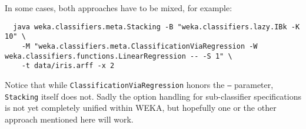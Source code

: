 \noindent In some cases, both approaches have to be mixed, for example:

{\scriptsize
\begin{verbatim}
  java weka.classifiers.meta.Stacking -B "weka.classifiers.lazy.IBk -K 10" \
    -M "weka.classifiers.meta.ClassificationViaRegression -W weka.classifiers.functions.LinearRegression -- -S 1" \
    -t data/iris.arff -x 2
\end{verbatim}}

\noindent Notice that while \texttt{ClassificationViaRegression} honors the \texttt{--} parameter, \texttt{Stacking} itself does not. Sadly the option handling for sub-classifier specifications is not yet completely unified within WEKA, but hopefully one or the other approach mentioned here will work. 

